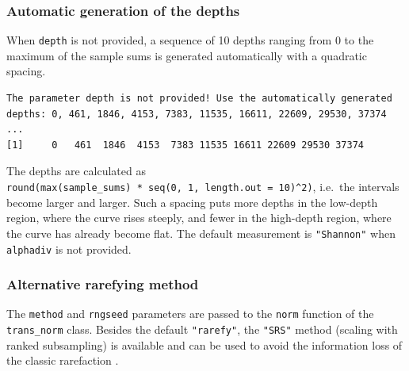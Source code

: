 \documentclass[
]{book}
\newenvironment{Shaded}{\begin{snugshade}}{\end{snugshade}}
\newcommand{\AttributeTok}[1]{\textcolor[rgb]{0.13,0.29,0.53}{#1}}
\newcommand{\CommentTok}[1]{\textcolor[rgb]{0.56,0.35,0.01}{\textit{#1}}}
\newcommand{\FunctionTok}[1]{\textcolor[rgb]{0.13,0.29,0.53}{\textbf{#1}}}
\newcommand{\NormalTok}[1]{#1}
\newcommand{\OtherTok}[1]{\textcolor[rgb]{0.56,0.35,0.01}{#1}}
\newcommand{\SpecialCharTok}[1]{\textcolor[rgb]{0.81,0.36,0.00}{\textbf{#1}}}
\newcommand{\StringTok}[1]{\textcolor[rgb]{0.31,0.60,0.02}{#1}}
\begin{document}
\subsubsection{Automatic generation of the depths}\label{automatic-generation-of-the-depths}

When \texttt{depth} is not provided, a sequence of 10 depths ranging from 0 to the maximum of the sample sums is
generated automatically with a quadratic spacing.

\begin{Shaded}
\end{Shaded}

\begin{verbatim}
The parameter depth is not provided! Use the automatically generated depths: 0, 461, 1846, 4153, 7383, 11535, 16611, 22609, 29530, 37374 ...
[1]     0   461  1846  4153  7383 11535 16611 22609 29530 37374
\end{verbatim}

The depths are calculated as \texttt{round(max(sample\_sums)\ *\ seq(0,\ 1,\ length.out\ =\ 10)\^{}2)}, i.e.~the intervals
become larger and larger.
Such a spacing puts more depths in the low-depth region, where the curve rises steeply, and fewer in the
high-depth region, where the curve has already become flat.
The default measurement is \texttt{"Shannon"} when \texttt{alphadiv} is not provided.

\subsubsection{Alternative rarefying method}\label{alternative-rarefying-method}

The \texttt{method} and \texttt{rngseed} parameters are passed to the \texttt{norm} function of the \texttt{trans\_norm} class.
Besides the default \texttt{"rarefy"}, the \texttt{"SRS"} method (scaling with ranked subsampling) is available and can
be used to avoid the information loss of the classic rarefaction \citep{Beule_normalization_2020}.
\end{document}
